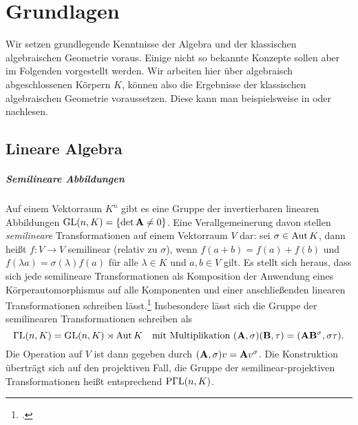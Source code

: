\chapter{Grundlagen} \label{chap:prelim}
Wir setzen grundlegende Kenntnisse der Algebra und der klassischen algebraischen Geometrie voraus. Einige nicht so bekannte Konzepte sollen aber im Folgenden vorgestellt werden. Wir arbeiten hier über algebraisch abgeschlossenen Körpern $K$, können also die Ergebnisse der klassischen algebraischen Geometrie voraussetzen. Diese kann man beispielsweise in \cite{Shafarevich} oder \cite{Mumford} nachlesen.

\section{Lineare Algebra}
\paragraph{Semilineare Abbildungen} Auf einem Vektorraum $K^n$ gibt es eine Gruppe der invertierbaren linearen Abbildungen $\mathrm{GL}(n,K) = \{\det \mathbf{A} \neq 0\}$. Eine Verallgemeinerung davon stellen \emph{semilineare} Transformationen auf einem Vektorraum $V$ dar: sei $\sigma \in \operatorname{Aut} K$, dann heißt $f: V \to V$ semilinear (relativ zu $\sigma$), wenn $f(a+b) = f(a) + f(b)$ und $f(\lambda a) = \sigma(\lambda)f(a)$ für alle $\lambda \in K$ und $a, b \in V$ gilt. Es stellt sich heraus, dass sich jede semilineare Transformationen als Komposition der Anwendung eines Körperautomorphismus auf alle Komponenten und einer anschließenden linearen Transformationen schreiben lässt.\footcite[Das folgt leicht aus den Bemerkungen in][S.~2--3]{Dieudonne} Insbesondere lässt sich die Gruppe der semilinearen Transformationen schreiben als
\begin{equation}
\mathrm{\Gamma L}(n,K) = \mathrm{GL}(n,K) \rtimes \operatorname{Aut} K \quad\text{mit Multiplikation } (\mathbf{A}, \sigma)(\mathbf{B}, \tau) = (\mathbf{A} \mathbf{B}^\sigma, \sigma \tau).
\end{equation}
Die Operation auf $V$ ist dann gegeben durch $(\mathbf{A}, \sigma)v = \mathbf{A} v^\sigma$. Die Konstruktion überträgt sich auf den projektiven Fall, die Gruppe der semilinear-projektiven Transformationen heißt entsprechend $\mathrm{P\Gamma L}(n,K)$.

